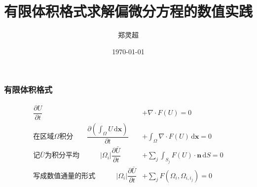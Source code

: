 \documentclass[8pt,mathserif]{beamer}
\newcommand\bx{\boldsymbol{x}}
\newcommand\dd{\,\mathrm{d}}
\newcommand\pd[2]{\dfrac{\partial {#1}}{\partial {#2}}}
\begin{document}
\title[]{
{
有限体积格式求解偏微分方程的数值实践
}
}

\author[郑灵超]{
  \normalsize  郑灵超}

\date[\today]{\today}


\frame{\titlepage}



\begin{frame}
  \frametitle{有限体积格式}
\begin{align*}
 \pd{U}{t}&+\nabla \cdot F(U) = 0\\
\text{在区域$\Omega$积分}\qquad   
\pd{(\int_{\Omega}U\dd\bx)}{t} &+ \int_{\Omega} \nabla \cdot
F(U)\dd\bx = 0\\
\text{记$\bar{U}$为积分平均}\qquad\quad
  |\Omega_i|\pd{\bar{U}}{t} &+ \sum_{j} \int_{S_j} F(U)\cdot \bm{n}
   \dd S = 0\\
\text{写成数值通量的形式}\qquad\quad
  |\Omega_i|\pd{\bar{U}}{t} &+ \sum_{j} \hat{F}(\Omega_i,\Omega_{i,i_j})= 0 
\end{align*}  
\end{frame}
\end{document}
